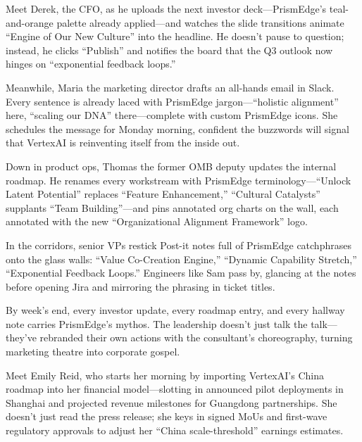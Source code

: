 Meet Derek, the CFO, as he uploads the next investor deck—PrismEdge’s teal-and-orange palette already applied—and 
watches the slide transitions animate “Engine of Our New Culture” into the headline. He doesn’t pause to question; 
instead, he clicks “Publish” and notifies the board that the Q3 outlook now hinges on “exponential feedback loops.”

Meanwhile, Maria the marketing director drafts an all-hands email in Slack. Every sentence is already laced with 
PrismEdge jargon—“holistic alignment” here, “scaling our DNA” there—complete with custom PrismEdge icons. She 
schedules the message for Monday morning, confident the buzzwords will signal that VertexAI is reinventing itself 
from the inside out.

Down in product ops, Thomas the former OMB deputy updates the internal roadmap. He renames every workstream with 
PrismEdge terminology—“Unlock Latent Potential” replaces “Feature Enhancement,” “Cultural Catalysts” supplants 
“Team Building”—and pins annotated org charts on the wall, each annotated with the new “Organizational Alignment 
Framework” logo.

In the corridors, senior VPs restick Post-it notes full of PrismEdge catchphrases onto the glass walls: “Value 
Co-Creation Engine,” “Dynamic Capability Stretch,” “Exponential Feedback Loops.” Engineers like Sam pass by, 
glancing at the notes before opening Jira and mirroring the phrasing in ticket titles.

By week’s end, every investor update, every roadmap entry, and every hallway note carries PrismEdge’s mythos. 
The leadership doesn’t just talk the talk—they’ve rebranded their own actions with the consultant’s choreography, 
turning marketing theatre into corporate gospel.


Meet Emily Reid, who starts her morning by importing VertexAI’s China roadmap into her financial model—slotting in 
announced pilot deployments in Shanghai and projected revenue milestones for Guangdong partnerships. She doesn’t 
just read the press release; she keys in signed MoUs and first-wave regulatory approvals to adjust her “China 
scale-threshold” earnings estimates.

\medskip

